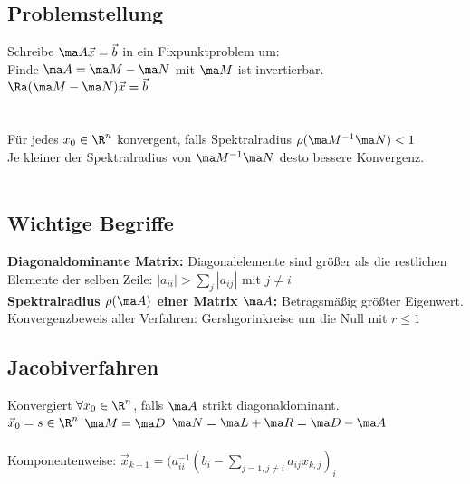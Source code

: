 \documentclass[fs, footer]{latex4ei}
\begin{document}
\begin{sectionbox}
\begin{sectionbox}
\begin{sectionbox}
	\subsection*{Problemstellung}
	Schreibe $\ma A \vec x = \vec b$ in ein Fixpunktproblem um:\\
	Finde $\ma A = \ma M - \ma N$ mit $\ma M$ ist invertierbar. \quad $\Ra (\ma M - \ma N)\vec x = \vec b$\\
	\\
	\\
	Für jedes $x_0 \in \R^n$ konvergent, falls Spektralradius $\rho(\ma M^{-1}\ma N) < 1$\\
	Je kleiner der Spektralradius von $\ma M^{-1}\ma N$ desto bessere Konvergenz.\\
	\\
\end{sectionbox}

\begin{sectionbox}
	\subsection*{Wichtige Begriffe}
	\textbf{Diagonaldominante Matrix:} Diagonalelemente sind größer als die restlichen Elemente der selben Zeile: $|a_{ii}| > \sum_{j} |a_{ij}|$ mit $j \ne i$\\
	\textbf{Spektralradius $\rho(\ma A)$ einer Matrix $\ma A$:} Betragsmäßig größter Eigenwert. \\
	Konvergenzbeweis aller Verfahren: Gershgorinkreise um die Null mit $r \le 1$
\end{sectionbox}

\begin{sectionbox}
	\subsection{Jacobiverfahren}
	Konvergiert $\forall x_0 \in \R^n$, falls $\ma A$ strikt diagonaldominant.\\
	$\vec x_0 = s \in \R^n$ \qquad $\ma M = \ma D$ \qquad $\ma N = \ma L + \ma R = \ma D - \ma A$\\
	\\
	Komponentenweise: $\vec x_{k+1} = (a^{-1}_{ii}(b_i - \sum\limits_{j = 1, j \ne i} a_{ij} x_{k,j} )_i$
\end{sectionbox}


\end{sectionbox}
\end{sectionbox}
\end{document}
